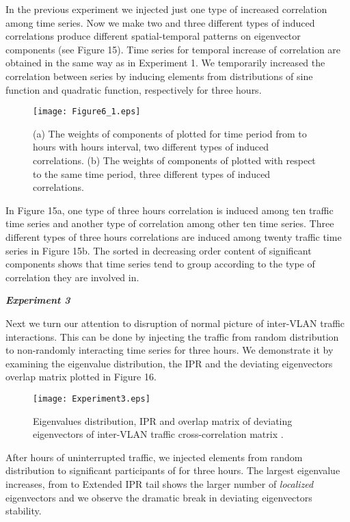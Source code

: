 \documentclass{IEEEtran}
\begin{document}
In the previous experiment we injected just one type of increased
correlation among time series. Now we make two and three different
types of induced correlations produce different spatial-temporal patterns
on eigenvector  components (see Figure 15). Time series
for temporal increase of correlation are obtained in the same way
as in Experiment 1. We temporarily increased the correlation between
series by inducing elements from distributions of sine function and
quadratic function, respectively for three hours.\begin{figure}[h]
\begin{center}\texttt{[image: Figure6\_1.eps]}\end{center}


\caption{\label{15} (a) The weights of components of  plotted for
time period from  to  hours with  hours interval, two
different types of induced correlations. (b) The weights of components
of  plotted with respect to the same time period, three
different types of induced correlations. }
\end{figure}
In Figure 15a, one type of three hours correlation is induced among
ten traffic time series and another type of correlation among other
ten time series. Three different types of three hours correlations
are induced among twenty traffic time series in Figure 15b. The sorted
in decreasing order content of significant components shows that time
series tend to group according to the type of correlation they are
involved in. 

\textbf{\emph{Experiment 3}}

Next we turn our attention to disruption of normal picture of inter-VLAN
traffic interactions. This can be done by injecting the traffic from
random distribution to non-randomly interacting time series for three
hours. We demonstrate it by examining the eigenvalue distribution,
the IPR and the deviating eigenvectors overlap matrix plotted in Figure
16.\begin{figure}[h]
\begin{center}\texttt{[image: Experiment3.eps]}\end{center}


\caption{\label{16} Eigenvalues distribution, IPR and overlap matrix of deviating
eigenvectors of inter-VLAN traffic cross-correlation matrix . }
\end{figure}
After  hours of uninterrupted traffic, we injected elements from
random distribution to significant participants of  for
three hours. The largest eigenvalue increases, from  to 
Extended IPR tail shows the larger number of \emph{localized} eigenvectors
and we observe the dramatic break in deviating eigenvectors stability.
\end{document}
